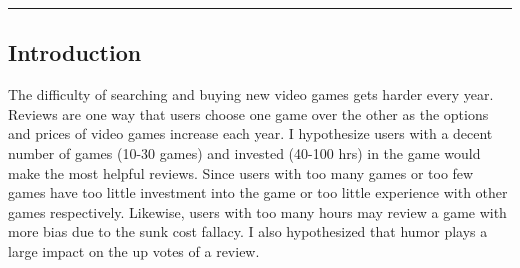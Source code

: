 {\color{gray}\hrule}
\begin{center}
\section*{Introduction}
\end{center}

The difficulty of searching and buying new video games gets harder every year. Reviews are one way that users choose one game over the other as the options and prices of video games increase each year. I hypothesize users with a decent number of games (10-30 games) and invested (40-100 hrs) in the game would make the most helpful reviews. Since users with too many games or too few games have too little investment into the game or too little experience with other games respectively. Likewise, users with too many hours may review a game with more bias due to the sunk cost fallacy. I also hypothesized that humor plays a large impact on the up votes of a review. 